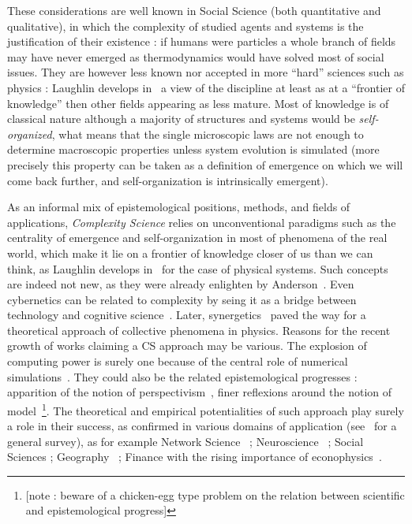 These considerations are well known in Social Science (both quantitative and qualitative), in which the complexity of studied agents and systems is the justification of their existence : if humans were particles a whole branch of fields may have never emerged as thermodynamics would have solved most of social issues.  
They are however less known nor accepted in more ``hard'' sciences such as physics : Laughlin develops in~\cite{laughlin2006different} a view of the discipline at least as at a ``frontier of knowledge'' then other fields appearing as less mature. Most of knowledge is of classical nature although a majority of structures and systems would be \emph{self-organized}, what means that the single microscopic laws are not enough to determine macroscopic properties unless system evolution is simulated (more precisely this property can be taken as a definition of emergence on which we will come back further, and self-organization is intrinsically emergent).


As an informal mix of epistemological positions, methods, and fields of applications, \emph{Complexity Science} relies on unconventional paradigms such as the centrality of emergence and self-organization in most of phenomena of the real world, which make it lie on a frontier of knowledge closer of us than we can think, as Laughlin develops in~\cite{laughlin2006different} for the case of physical systems. Such concepts are indeed not new, as they were already enlighten by Anderson~\cite{anderson1972more}. Even cybernetics can be related to complexity by seing it as a bridge between technology and cognitive science~\cite{wiener1948cybernetics}. Later, synergetics~\cite{haken1980synergetics} paved the way for a theoretical approach of collective phenomena in physics. Reasons for the recent growth of works claiming a CS approach may be various. The explosion of computing power is surely one because of the central role of numerical simulations~\cite{varenne2010simulations}. They could also be the related epistemological progresses : apparition of the notion of perspectivism~\cite{giere2010scientific}, finer reflexions around the notion of model~\cite{varenne2013modeliser}\footnote{[note : beware of a chicken-egg type problem on the relation between scientific and epistemological progress]}. The theoretical and empirical potentialities of such approach play surely a role in their success, as confirmed in various domains of application (see~\cite{newman2011complex} for a general survey), as for example Network Science~\cite{barabasi2002linked} ; Neuroscience~\cite{koch1999complexity} ; Social Sciences  ; Geography~\cite{manson2001simplifying}\cite{pumain1997pour} ; Finance with the rising importance of econophysics~\cite{stanley1999econophysics}.





